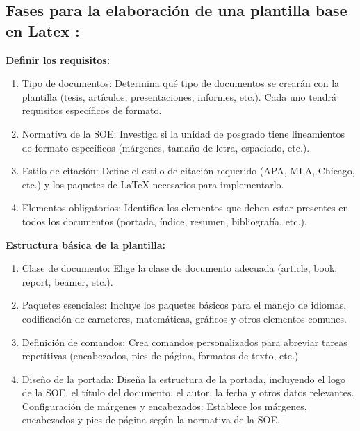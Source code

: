 \documentclass[10pt,twocolumn]{article}
\begin{document}
    \subsection{Fases para la elaboración de una plantilla base en Latex :}
    
{\raggedleft \textbf{Definir los requisitos:}}
    \begin{enumerate}
        \item Tipo de documentos: Determina qué tipo de documentos se crearán con la plantilla (tesis, artículos, presentaciones, informes, etc.). Cada uno tendrá requisitos específicos de formato.
        \item Normativa de la SOE: Investiga si la unidad de posgrado tiene lineamientos de formato específicos (márgenes, tamaño de letra, espaciado, etc.).
        \item Estilo de citación: Define el estilo de citación requerido (APA, MLA, Chicago, etc.) y los paquetes de LaTeX necesarios para implementarlo.
        \item Elementos obligatorios: Identifica los elementos que deben estar presentes en todos los documentos (portada, índice, resumen, bibliografía, etc.).
    \end{enumerate}
    
{\raggedleft \textbf{Estructura básica de la plantilla:}}
    \begin{enumerate}
        \item Clase de documento: Elige la clase de documento adecuada (article, book, report, beamer, etc.).
        \item Paquetes esenciales: Incluye los paquetes básicos para el manejo de idiomas, codificación de caracteres, matemáticas, gráficos y otros elementos comunes.
        \item Definición de comandos: Crea comandos personalizados para abreviar tareas repetitivas (encabezados, pies de página, formatos de texto, etc.).
        \item Diseño de la portada: Diseña la estructura de la portada, incluyendo el logo de la SOE, el título del documento, el autor, la fecha y otros datos relevantes.
    Configuración de márgenes y encabezados: Establece los márgenes, encabezados y pies de página según la normativa de la SOE.
    \end{enumerate}
\end{document}
